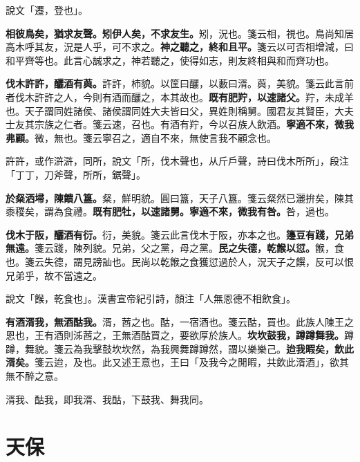 \begin{quoting}說文「遷，登也」。\end{quoting}

\textbf{相彼鳥矣，猶求友聲。矧伊人矣，不求友生。}{\footnotesize 矧，況也。箋云相，視也。鳥尚知居高木呼其友，況是人乎，可不求之。}\textbf{神之聽之，終和且平。}{\footnotesize 箋云以可否相增減，曰和平齊等也。此言心誠求之，神若聽之，使得如志，則友終相與和而齊功也。}

\textbf{伐木許許，釃酒有藇。}{\footnotesize 許許，杮貌。以筐曰釃，以藪曰湑。藇，美貌。箋云此言前者伐木許許之人，今則有酒而釃之，本其故也。}\textbf{既有肥羜，以速諸父。}{\footnotesize 羜，未成羊也。天子謂同姓諸侯、諸侯謂同姓大夫皆曰父，異姓則稱舅。國君友其賢臣，大夫士友其宗族之仁者。箋云速，召也。有酒有羜，今以召族人飲酒。}\textbf{寧適不來，微我弗顧。}{\footnotesize 微，無也。箋云寧召之，適自不來，無使言我不顧念也。}

\begin{quoting}許許，或作滸滸，同所，說文「所，伐木聲也，从斤戶聲，詩曰伐木所所」，段注「丁丁，刀斧聲，所所，鋸聲」。\end{quoting}

\textbf{於粲洒埽，陳饋八簋。}{\footnotesize 粲，鮮明貌。圓曰簋，天子八簋。箋云粲然已灑拚矣，陳其黍稷矣，謂為食禮。}\textbf{既有肥牡，以速諸舅。寧適不來，微我有咎。}{\footnotesize 咎，過也。}

\textbf{伐木于阪，釃酒有衍。}{\footnotesize 衍，美貌。箋云此言伐木于阪，亦本之也。}\textbf{籩豆有踐，兄弟無遠。}{\footnotesize 箋云踐，陳列貌。兄弟，父之黨，母之黨。}\textbf{民之失德，乾餱以愆。}{\footnotesize 餱，食也。箋云失德，謂見謗訕也。民尚以乾餱之食獲愆過於人，況天子之饌，反可以恨兄弟乎，故不當遠之。}

\begin{quoting}說文「餱，乾食也」。漢書宣帝紀引詩，顏注「人無恩德不相飲食」。\end{quoting}

\textbf{有酒湑我，無酒酤我。}{\footnotesize 湑，莤之也。酤，一宿酒也。箋云酤，買也。此族人陳王之恩也，王有酒則泲莤之，王無酒酤買之，要欲厚於族人。}\textbf{坎坎鼓我，蹲蹲舞我。}{\footnotesize 蹲蹲，舞貌。箋云為我擊鼓坎坎然，為我興舞蹲蹲然，謂以樂樂己。}\textbf{迨我暇矣，飲此湑矣。}{\footnotesize 箋云迨，及也。此又述王意也，王曰「及我今之閒暇，共飲此湑酒」，欲其無不醉之意。}

\begin{quoting}湑我、酤我，即我湑、我酤，下鼓我、舞我同。\end{quoting}

\section{天保}


